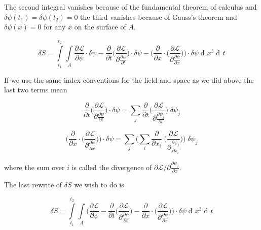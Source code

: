 \documentclass{article}
\DeclareMathOperator{\dd}{d\!}
\begin{document}
The second integral vanishes because of the fundamental theorem of calculus and $\delta \psi(t_1) = \delta \psi(t_2) = 0$ the third vanishes because of Gauss's theorem and $\delta \psi(x) = 0$ for any $x$ on the surface of $A$.

\begin{equation}
\delta S = \int\limits_{t_1}^{t_2} \int\limits_{A} 
\frac{\partial \mathcal{L}}{\partial \psi} \cdot \delta \psi
-\frac{\partial}{\partial t} \bigg( \frac{\partial \mathcal{L}}{\partial \frac{\partial \psi}{\partial t}} \bigg) \cdot \delta \psi
-\bigg(\frac{\partial}{\partial x} \cdot \bigg( \frac{\partial \mathcal{L}}{\partial \frac{\partial \psi}{\partial x}} \bigg)\bigg) \cdot \delta \psi
\dd x^3 \dd t
\end{equation}

If we use the same index conventions for the field and space as we did above the last two terms mean

\begin{equation}
\frac{\partial}{\partial t} \bigg( \frac{\partial \mathcal{L}}{\partial \frac{\partial \psi}{\partial t}} \bigg) \cdot \delta \psi
= \sum_j \frac{\partial}{\partial t} \bigg( \frac{\partial \mathcal{L}}{\partial \frac{\partial \psi_j}{\partial t}} \bigg) \; \delta \psi_j
\end{equation}

\begin{equation}
\bigg(\frac{\partial}{\partial x} \cdot \bigg( \frac{\partial \mathcal{L}}{\partial \frac{\partial \psi}{\partial x}} \bigg)\bigg) \cdot \delta \psi
= \sum_j \bigg(\sum_i \frac{\partial}{\partial x_i} \; \bigg( \frac{\partial \mathcal{L}}{\partial \frac{\partial \psi_j}{\partial x_i}} \bigg)\bigg) \; \delta \psi_j
\end{equation}

where the sum over $i$ is called the divergence of $\partial \mathcal{L} / \partial \frac{\partial \psi_j}{\partial x}$.

The last rewrite of $\delta S$ we wish to do is 

\begin{equation}
\delta S = \int\limits_{t_1}^{t_2} \int\limits_{A} 
\bigg(
\frac{\partial \mathcal{L}}{\partial \psi}
-\frac{\partial}{\partial t} \bigg( \frac{\partial \mathcal{L}}{\partial \frac{\partial \psi}{\partial t}} \bigg) 
-\frac{\partial}{\partial x} \cdot \bigg( \frac{\partial \mathcal{L}}{\partial \frac{\partial \psi}{\partial x}} \bigg)\bigg) \cdot \delta \psi
\dd x^3 \dd t
\end{equation}
\end{document}
